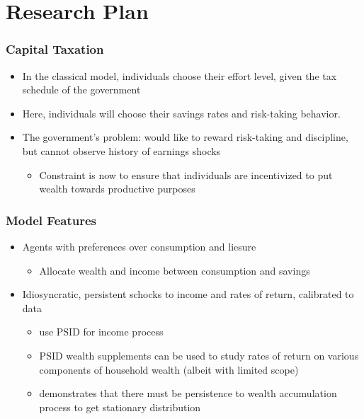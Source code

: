 \documentclass{beamer}
\begin{document}
\section{Research Plan}

\begin{frame}
    \frametitle{Capital Taxation} %

    \begin{itemize}
        \item In the classical \cite{mirrlees1971exploration} model, individuals choose their effort level, given the tax schedule of the government
        \item Here, individuals will choose their savings rates and risk-taking behavior.
        \item The government's problem: would like to reward risk-taking and discipline, but cannot observe history of earnings shocks   
        \begin{itemize}
            \item Constraint is now to ensure that individuals are incentivized to put wealth towards productive purposes %
        \end{itemize}
    \end{itemize}

\end{frame}

\begin{frame}
    \frametitle{Model Features}

    \begin{itemize}
        \item Agents with preferences over consumption and liesure
        \begin{itemize}
            \item Allocate wealth and income between consumption and savings 
        \end{itemize}
        \item Idiosyncratic, persistent schocks to income and rates of return, calibrated to data 
        \begin{itemize}
            \item  \cite{floden2001idiosyncratic} use PSID for income process
            \item PSID wealth supplements can be used to study rates of return on various components of household wealth (albeit with limited scope)
            \item \cite{benhabib2011distribution} demonstrates that there must be persistence to wealth accumulation process to get stationary distribution
        \end{itemize}
    \end{itemize}

\end{frame}
\end{document}
